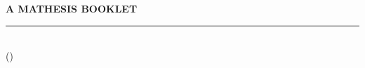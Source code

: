 \begin{titlepage}
\thispagestyle{empty}
\begin{center}
\vspace*{3cm}

{\sffamily\footnotesize\bfseries\color{accent}\MakeUppercase{A Mathesis Booklet}}

\vspace{1.5cm}

{\selectfont\Huge\bfseries\color{primary}\BookletTitle\par}

\vspace{0.8cm}
\textcolor{accent}{\rule{0.35\textwidth}{1.2pt}}
\vspace{0.8cm}

{\Large\itshape\color{textsecondary}\BookletSubtitle\par}

\vfill

{\large\bfseries\BookletAuthor}\\[0.2em]
{\small\color{textsecondary}(\BookletAuthorHandle)}\\[0.2em]
{\small\ttfamily\color{textsecondary}\BookletEmail}

\vspace{1.5cm}
{\small\color{textsecondary}\BookletYear}

\end{center}
\end{titlepage}
